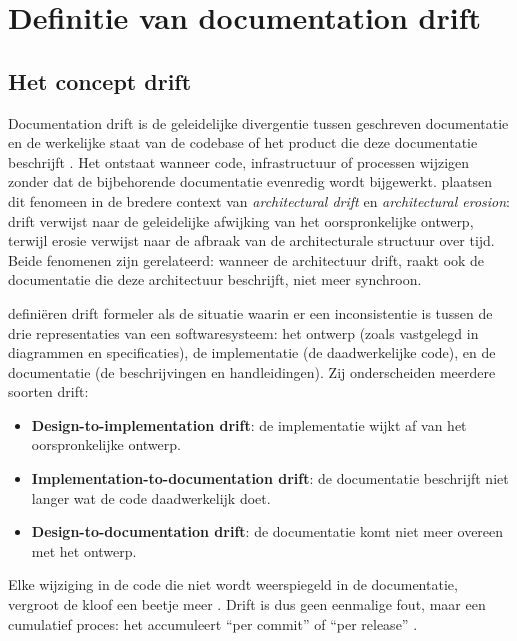 \section{Definitie van documentation drift}
\label{sec:drift-definitie}

\subsection{Het concept drift}
Documentation drift is de geleidelijke divergentie tussen geschreven documentatie en de werkelijke staat van de codebase of het product die deze documentatie beschrijft \autocite{whiting2020drifterosion}. Het ontstaat wanneer code, infrastructuur of processen wijzigen zonder dat de bijbehorende documentatie evenredig wordt bijgewerkt. \textcite{whiting2020drifterosion} plaatsen dit fenomeen in de bredere context van \textit{architectural drift} en \textit{architectural erosion}: drift verwijst naar de geleidelijke afwijking van het oorspronkelijke ontwerp, terwijl erosie verwijst naar de afbraak van de architecturale structuur over tijd. Beide fenomenen zijn gerelateerd: wanneer de architectuur drift, raakt ook de documentatie die deze architectuur beschrijft, niet meer synchroon.

\textcite{romeo2024didrift} definiëren drift formeler als de situatie waarin er een inconsistentie is tussen de drie representaties van een softwaresysteem: het ontwerp (zoals vastgelegd in diagrammen en specificaties), de implementatie (de daadwerkelijke code), en de documentatie (de beschrijvingen en handleidingen). Zij onderscheiden meerdere soorten drift:

\begin{itemize}
    \item \textbf{Design-to-implementation drift}: de implementatie wijkt af van het oorspronkelijke ontwerp.
    \item \textbf{Implementation-to-documentation drift}: de documentatie beschrijft niet langer wat de code daadwerkelijk doet.
    \item \textbf{Design-to-documentation drift}: de documentatie komt niet meer overeen met het ontwerp.
\end{itemize}

Elke wijziging in de code die niet wordt weerspiegeld in de documentatie, vergroot de kloof een beetje meer \autocite{romeo2024didrift}. Drift is dus geen eenmalige fout, maar een cumulatief proces: het accumuleert ``per commit'' of ``per release'' \autocite{whiting2020drifterosion}.

